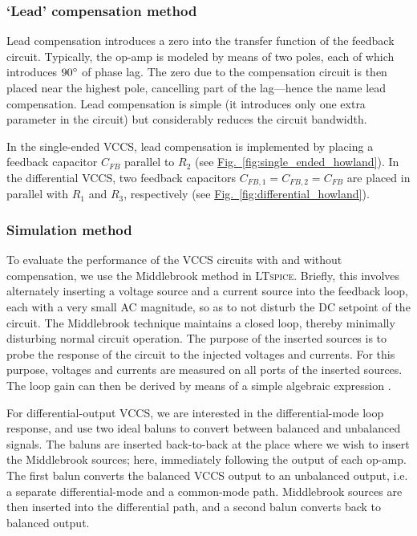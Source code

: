 \documentclass[10pt]{article}
\newcommand{\brieffiglink}[1]{\hyperref[#1]{Fig.~\ref*{#1}}}
\begin{document}
\subsubsection{`Lead' compensation method}

Lead compensation introduces a zero into the transfer function of the feedback circuit. Typically, the op-amp is modeled by means of two poles, each of which introduces $90\degree$ of phase lag. The zero due to the compensation circuit is then placed near the highest pole, cancelling part of the lag---hence the name lead compensation. Lead compensation is simple (it introduces only one extra parameter in the circuit) but considerably reduces the circuit bandwidth.

In the single-ended VCCS, lead compensation is implemented by placing a feedback capacitor $C_{FB}$ parallel to $R_2$ (see \brieffiglink{fig:single_ended_howland}). In the differential VCCS, two feedback capacitors $C_{FB,1}=C_{FB,2}=C_{FB}$ are placed in parallel with $R_1$ and $R_3$, respectively (see \brieffiglink{fig:differential_howland}).


\subsubsection{Simulation method}

To evaluate the performance of the VCCS circuits with and without compensation, we use the Middlebrook method in \textsc{LTspice}. Briefly, this involves alternately inserting a voltage source and a current source into the feedback loop, each with a very small AC magnitude, so as to not disturb the DC setpoint of the circuit. The Middlebrook technique maintains a closed loop, thereby minimally disturbing normal circuit operation. The purpose of the inserted sources is to probe the response of the circuit to the injected voltages and currents. For this purpose, voltages and currents are measured on all ports of the inserted sources. The loop gain can then be derived by means of a simple algebraic expression \cite{middlebrook_method}.

For differential-output VCCS, we are interested in the differential-mode loop response, and use two ideal baluns \cite{kundert_balun} to convert between balanced and unbalanced signals. The baluns are inserted back-to-back at the place where we wish to insert the Middlebrook sources; here, immediately following the output of each op-amp. The first balun converts the balanced VCCS output to an unbalanced output, i.e. a separate differential-mode and a common-mode path. Middlebrook sources are then inserted into the differential path, and a second balun converts back to balanced output.
\end{document}
